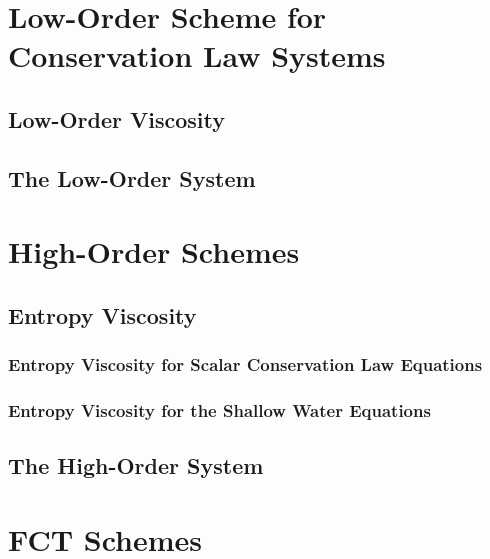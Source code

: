 \section{Low-Order Scheme for Conservation Law Systems}  
\subsection{Low-Order Viscosity\label{sec:low_order_viscosity_domain_invariant}}
  
\subsection{The Low-Order System\label{sec:low_order_system_domain_invariant}}
  
\section{High-Order Schemes}  
\subsection{Entropy Viscosity\label{sec:entropy_viscosity}}
  \subsubsection{Entropy Viscosity for Scalar Conservation Law Equations
    \label{sec:entropy_viscosity_scalar}}
    
  \subsubsection{Entropy Viscosity for the Shallow Water Equations
    \label{sec:shallowwater_entropy_viscosity}}
    
\subsection{The High-Order System}
  
\section{FCT Schemes}  
